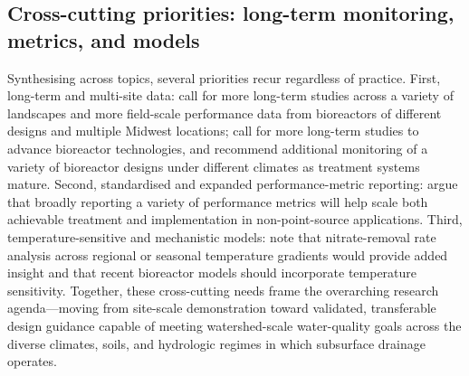 \documentclass[11pt]{article}
\begin{document}
\subsection{Cross-cutting priorities: long-term monitoring, metrics, and models}
Synthesising across topics, several priorities recur regardless of practice. First, long-term and multi-site data: \textcite{Bell2015} call for more long-term studies across a variety of landscapes and more field-scale performance data from bioreactors of different designs and multiple Midwest locations; \textcite{Christianson2021} call for more long-term studies to advance bioreactor technologies, and \textcite{Bailon2025} recommend additional monitoring of a variety of bioreactor designs under different climates as treatment systems mature. Second, standardised and expanded performance-metric reporting: \textcite{Maxwell2022} argue that broadly reporting a variety of performance metrics will help scale both achievable treatment and implementation in non-point-source applications. Third, temperature-sensitive and mechanistic models: \textcite{Christianson2021} note that nitrate-removal rate analysis across regional or seasonal temperature gradients would provide added insight and that recent bioreactor models should incorporate temperature sensitivity. Together, these cross-cutting needs frame the overarching research agenda---moving from site-scale demonstration toward validated, transferable design guidance capable of meeting watershed-scale water-quality goals across the diverse climates, soils, and hydrologic regimes in which subsurface drainage operates.

\printbibliography
\end{document}
